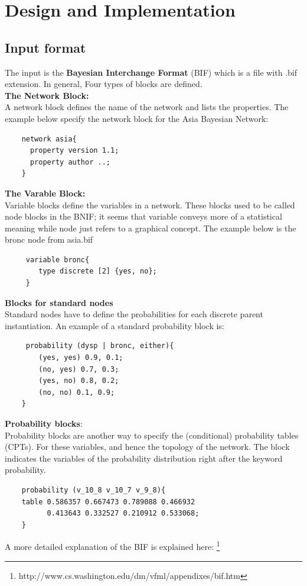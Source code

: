 \newpage
\section{Design and Implementation}
    \subsection{Input format}
    The input is the \textbf{Bayesian Interchange Format} (BIF) which is a file with .bif extension.
    In general, Four types of blocks are defined.\\
    \noindent \textbf{The Network Block:}\\
    A network block defines the name of the network and lists the properties. The example below specify the network block for the Asia Bayesian Network:
    \begin{lstlisting}
    network asia{
      property version 1.1;
      property author ..;
    }
    \end{lstlisting}
    
    \noindent \textbf{The Varable Block:}\\
    Variable blocks define the variables in a network. These blocks used
    to be called node blocks in the BNIF; it seems that variable conveys
    more of a statistical meaning while node just refers to a graphical
    concept. The example below is the bronc node from asia.bif
    \begin{lstlisting}
     variable bronc{
        type discrete [2] {yes, no};
     }
    \end{lstlisting}
    
    \noindent \textbf{Blocks for standard nodes}\\
    Standard nodes have to define the probabilities for each discrete parent instantiation. An example of a standard probability block is: 
    \begin{lstlisting}
     probability (dysp | bronc, either){
        (yes, yes) 0.9, 0.1;
        (no, yes) 0.7, 0.3;
        (yes, no) 0.8, 0.2;
        (no, no) 0.1, 0.9;
    }
    \end{lstlisting}
    
    \noindent \textbf{Probability blocks}:\\
    Probability blocks are another way to specify the (conditional) probability tables (CPTs). For these variables, and hence the topology of the network. The block indicates the variables of the probability distribution right after the keyword probability.
    \begin{lstlisting}
    probability (v_10_8 v_10_7 v_9_8){ 
	table 0.586357 0.667473 0.789088 0.466932 
	      0.413643 0.332527 0.210912 0.533068;
    }
    \end{lstlisting}
    A more detailed explanation of the BIF is explained here: \footnote{http://www.cs.washington.edu/dm/vfml/appendixes/bif.htm} \\
    
